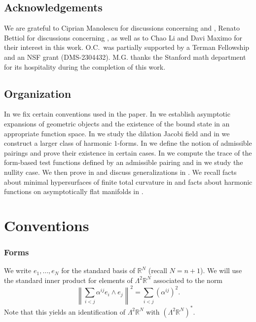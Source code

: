 \documentclass[11pt]{amsart}
\numberwithin{equation}{section}
\theoremstyle{plain}
\theoremstyle{definition}
\theoremstyle{remark}
\newcommand{\R}{\mathbb{R}}
\begin{document}
\subsection{Acknowledgements} We are grateful to Ciprian Manolescu for discussions concerning  and , Renato Bettiol for discussions concerning , as well as to Chao Li and Davi Maximo for their interest in this work.  O.C.\ was partially supported by a Terman Fellowship and an
NSF grant (DMS-2304432). M.G. thanks the Stanford math department for its hospitality during the completion of this work.

\subsection{Organization}
In  we fix certain conventions used in the paper. In  we establish asymptotic expansions of geometric objects and the existence of the bound state in an appropriate function space. In  we study the dilation Jacobi field and in  we construct a larger class of harmonic $1$-forms. In  we define the notion of admissible pairings and prove their existence in certain cases. In  we compute the trace of the form-based test functions defined by an admissible pairing and in  we study the nullity case. We then prove  in  and discuss generalizations in . We recall facts about minimal hypersurfaces of finite total curvature in  and facts about harmonic functions on asymptotically flat manifolds in . 

\section{Conventions}\label{sec:conv}
\subsubsection{Forms} We write $e_1,\dots,e_N$ for the standard basis of $\R^N$ (recall $N = n+1$). We will use the standard inner product for elements of $\Lambda^2\R^{N}$ associated to the norm
\begin{equation}\label{eq:inner-prod-forms}
\left\| \sum_{i<j} \alpha^{ij} e_i \wedge e_j \right\|^2 = \sum_{i<j} (\alpha^{ij})^2.
\end{equation}
Note that this yields an identification of $\Lambda^2\R^N$ with $(\Lambda^2\R^N)^*$.
\end{document}
